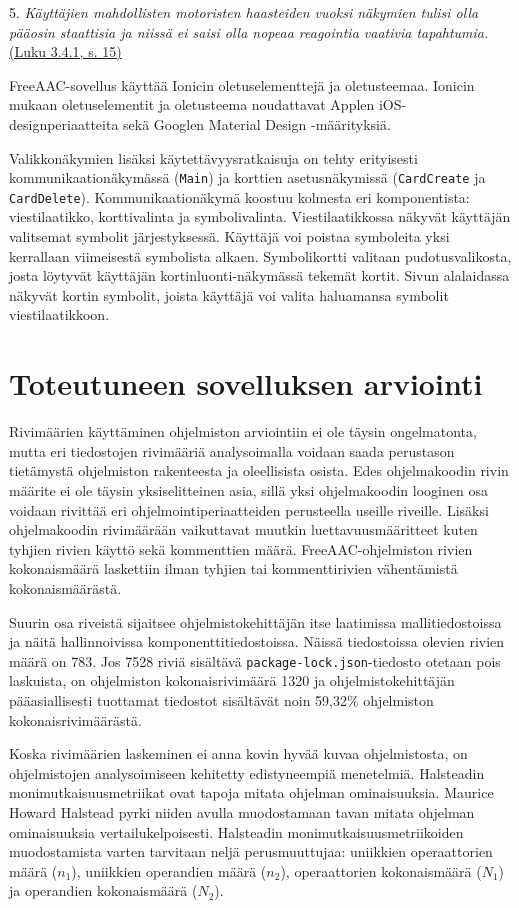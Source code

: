 \documentclass[utf8]{gradu3}
\begin{document}
5. \textit{Käyttäjien mahdollisten motoristen haasteiden vuoksi näkymien tulisi olla pääosin staattisia ja niissä ei saisi olla nopeaa reagointia vaativia tapahtumia.} \hyperref[AAC-staticity]{(Luku 3.4.1, s. 15)}

FreeAAC-sovellus käyttää Ionicin oletuselementtejä ja oletusteemaa. Ionicin mukaan oletuselementit ja oletusteema noudattavat Applen iOS-designperiaatteita sekä Googlen Material Design -määrityksiä.  

Valikkonäkymien lisäksi käytettävyysratkaisuja on tehty erityisesti kommunikaationäkymässä (\texttt{Main}) ja korttien asetusnäkymissä (\texttt{CardCreate} ja \texttt{CardDelete}). Kommunikaationäkymä koostuu kolmesta eri komponentista: viestilaatikko, korttivalinta ja symbolivalinta. Viestilaatikkossa näkyvät käyttäjän valitsemat symbolit järjestyksessä. Käyttäjä voi poistaa symboleita yksi kerrallaan viimeisestä symbolista alkaen. Symbolikortti valitaan pudotusvalikosta, josta löytyvät käyttäjän kortinluonti-näkymässä tekemät kortit. Sivun alalaidassa näkyvät kortin symbolit, joista käyttäjä voi valita haluamansa symbolit viestilaatikkoon.

\chapter{Toteutuneen sovelluksen arviointi}

Rivimäärien käyttäminen ohjelmiston arviointiin ei ole täysin ongelmatonta, mutta eri tiedostojen rivimääriä analysoimalla voidaan saada perustason tietämystä ohjelmiston rakenteesta ja oleellisista osista. Edes ohjelmakoodin rivin määrite ei ole täysin yksiselitteinen asia, sillä yksi ohjelmakoodin looginen osa voidaan rivittää eri ohjelmointiperiaatteiden perusteella useille riveille. Lisäksi ohjelmakoodin rivimäärään vaikuttavat muutkin luettavuusmääritteet kuten tyhjien rivien käyttö sekä kommenttien määrä. FreeAAC-ohjelmiston rivien kokonaismäärä laskettiin ilman tyhjien tai kommenttirivien vähentämistä kokonaismäärästä.

Suurin osa riveistä sijaitsee ohjelmistokehittäjän itse laatimissa mallitiedostoissa ja näitä hallinnoivissa komponenttitiedostoissa. Näissä tiedostoissa olevien rivien määrä on 783. Jos 7528 riviä sisältävä \texttt{package-lock.json}-tiedosto otetaan pois laskuista, on ohjelmiston kokonaisrivimäärä 1320 ja ohjelmistokehittäjän pääasiallisesti tuottamat tiedostot sisältävät noin 59,32\% ohjelmiston kokonaisrivimäärästä.

Koska rivimäärien laskeminen ei anna kovin hyvää kuvaa ohjelmistosta, on ohjelmistojen analysoimiseen kehitetty edistyneempiä menetelmiä. Halsteadin monimutkaisuusmetriikat ovat tapoja mitata ohjelman ominaisuuksia. Maurice Howard Halstead pyrki niiden avulla muodostamaan tavan mitata ohjelman ominaisuuksia vertailukelpoisesti. Halsteadin monimutkaisuusmetriikoiden muodostamista varten tarvitaan neljä perusmuuttujaa: uniikkien operaattorien määrä ($n_1$), uniikkien operandien määrä ($n_2$), operaattorien kokonaismäärä ($N_1$) ja operandien kokonaismäärä ($N_2$).
\end{document}
